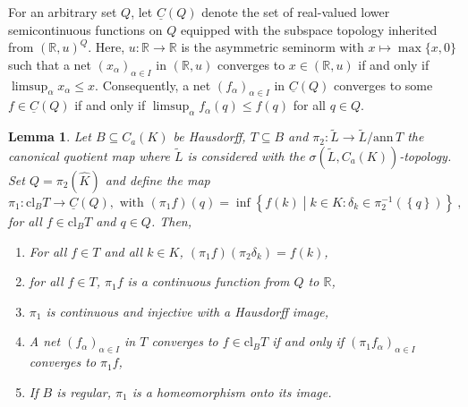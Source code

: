 \documentclass[
	paper=A4,
	pagesize=auto,
	fontsize=12pt
]{scrartcl}
\theoremstyle{plain}
\newtheorem{lemma}[theorem]{Lemma}
\theoremstyle{remark}
\theoremstyle{definition}
\begin{document}
For an arbitrary set $Q$, let $\underline{C}(Q)$ denote the set of real-valued lower semicontinuous functions on $Q$ equipped with the subspace topology inherited from $( \mathbb{R}, u )^Q$.
Here, $u : \mathbb{R} \to \mathbb{R}$ is the asymmetric seminorm with $x \mapsto \max\{ x, 0 \}$ such that a net $(x_\alpha)_{\alpha \in I}$ in $(\mathbb{R}, u)$ converges to $x \in (\mathbb{R}, u)$ if and only if $\limsup_\alpha x_\alpha \le x$.
Consequently, a net $(f_\alpha)_{\alpha \in I}$ in $\underline{C}(Q)$ converges to some $f \in \underline{C}(Q)$ if and only if $\limsup_\alpha f_\alpha(q) \le f(q)$ for all $q \in Q$.
%
\begin{lemma}
\label{lem:AsymmetricHausdorffQuotient}
Let $B \subseteq C_a(K)$ be Hausdorff, $T \subseteq B$ and $\pi_2 : \widetilde{L} \to \widetilde{L} / \mathrm{ann}\, T$ the canonical quotient map where $\widetilde{L}$ is considered with the $\sigma(\widetilde{L}, C_a(K))$-topology.
Set $Q = \pi_2(\widehat{K})$ and define the map
%
\begin{equation}
\pi_1 : \mathrm{cl}_B T \to \underline{C}(Q), \text{ with } \left( \pi_1 f \right) \left( q \right)
=
\inf \left\{ f \left( k \right) \middle| k \in K : \delta_k \in \pi_2^{-1} \left( \left\{ q \right\} \right) \right\} \ ,
\end{equation}
%
for all $f \in \mathrm{cl}_B T$ and $q \in Q$.
Then,
%
\begin{enumerate}
\item \label{itm:ProjectionOnCoreEquality} For all $f \in T$ and all $k \in K$, $( \pi_1 f ) ( \pi_2 \delta_k ) = f( k )$,
\item for all $f \in T$, $\pi_1 f$ is a continuous function from $Q$ to $\mathbb{R}$,
\item $\pi_1$ is continuous and injective with a Hausdorff image,
\item \label{itm:CoreContinuity} A net $(f_\alpha)_{\alpha \in I}$ in $T$ converges to $f \in \mathrm{cl}_B T$ if and only if $(\pi_1 f_\alpha)_{\alpha \in I}$ converges to $\pi_1 f$,
\item If $B$ is regular, $\pi_1$ is a homeomorphism onto its image.
\end{enumerate}
\end{lemma}
\end{document}
